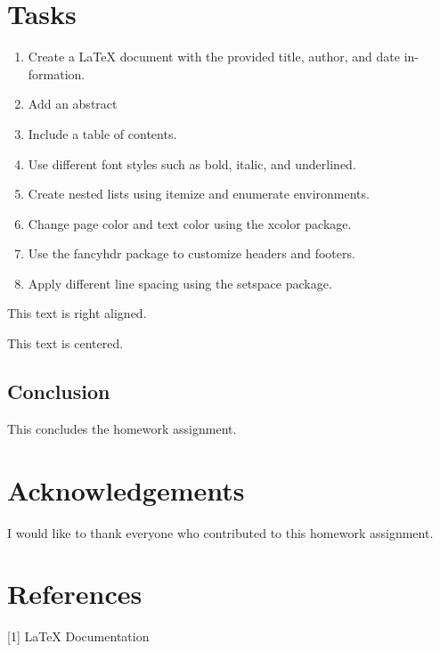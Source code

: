 \documentclass{article}
\begin{document}
\section{Tasks}
\begin{enumerate}
\item Create a LaTeX document with the provided title, author, and date in-
formation.
\item Add an abstract
\item Include a table of contents.
\item Use different font styles such as bold, italic, and underlined.
\item Create nested lists using itemize and enumerate environments.
\item Change page color and text color using the xcolor package.
\item Use the fancyhdr package to customize headers and footers.
\item Apply different line spacing using the setspace package.
\end{enumerate}

\begin{flushright}
This text is right aligned.
\end{flushright}
\begin{center}
  This text is centered.  
\end{center}

\subsection*{Conclusion}

This concludes the homework assignment.

\section*{Acknowledgements}
I would like to thank everyone who contributed to this homework assignment.

\section*{References}
[1] LaTeX Documentation
\end{document}
